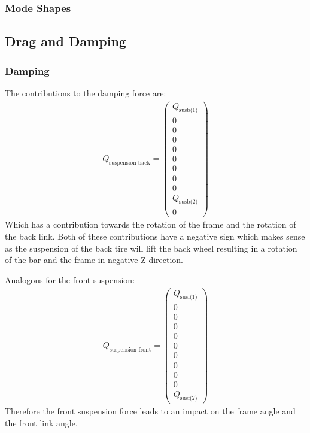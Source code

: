 \subsubsection{Mode Shapes}

\subsection{Drag and Damping}
\subsubsection{Damping}
The contributions to the damping force are:
\begin{equation}
    \begin{split}
        Q_{\text{suspension back}} = \begin{pmatrix}
            Q_{\text{susb(1)}}\\
            0\\
            0\\
            0\\
            0\\
            0\\
            0\\
            0\\
            0\\
            Q_{\text{susb(2)}}\\
            0
        \end{pmatrix}
    \end{split}
\end{equation}
Which has a contribution towards the rotation of the frame and the rotation of the back link. Both of these contributions have a negative sign which makes sense as the suspension of the back tire will lift the back wheel resulting in a rotation of the bar and the frame in negative Z direction.

Analogous for the front suspension:
\begin{equation}
    \begin{split}
        Q_{\text{suspension front}} = \begin{pmatrix}
            Q_{\text{susf(1)}}\\
            0\\
            0\\
            0\\
            0\\
            0\\
            0\\
            0\\
            0\\
            0\\
            Q_{\text{susf(2)}}
        \end{pmatrix}
    \end{split}
\end{equation}
Therefore the front suspension force leads to an impact on the frame angle and the front link angle.

